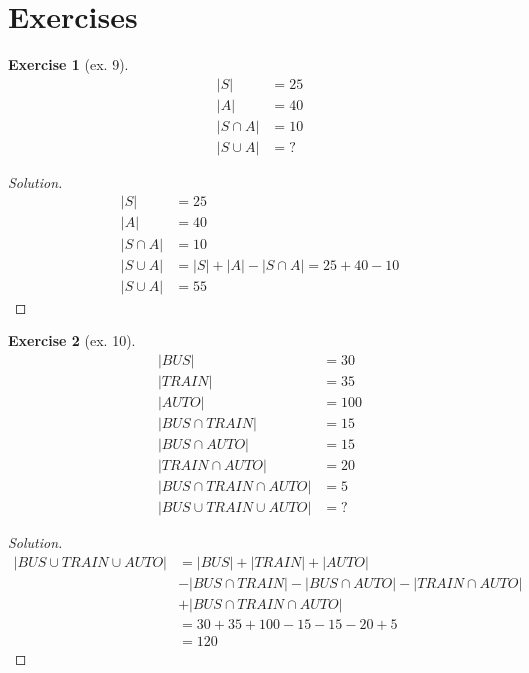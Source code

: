 \documentclass{article}
\theoremstyle{definition}
\newtheorem{exercise}{Exercise}[section]
\begin{document}
\section{Exercises}  %

\begin{exercise}[ex. 9]
    \[
    \begin{aligned}
        |S| &= 25 \\
        |A| &= 40 \\
        |S\cap A| &= 10\\
        |S\cup A| &= ?
    \end{aligned}
\]
\end{exercise}
\begin{proof}[Solution]
\[
    \begin{aligned}
        |S| &= 25 \\
        |A| &= 40 \\
        |S\cap A| &= 10\\
        |S\cup A| &= |S| + |A| - |S\cap A| = 25 + 40 - 10\\
        |S\cup A| &= 55
    \end{aligned}
\]
\end{proof}



\begin{exercise}[ex. 10]
    \[
    \begin{aligned}
        |BUS| &= 30 \\
        |TRAIN| &= 35 \\
        |AUTO| &= 100 \\
        |BUS \cap TRAIN| &= 15 \\
        |BUS \cap AUTO| &= 15 \\
        |TRAIN \cap AUTO| &= 20\\
        |BUS \cap TRAIN \cap AUTO| &= 5 \\
        |BUS \cup TRAIN \cup AUTO| &= ?
    \end{aligned}
\]
\end{exercise}
\begin{proof}[Solution]
\[
    \begin{aligned}
        |BUS \cup TRAIN \cup AUTO| &= |BUS| + |TRAIN| + |AUTO| \\
                                    &- |BUS \cap TRAIN| - |BUS \cap AUTO| - |TRAIN \cap AUTO| \\
                                    &+ |BUS \cap TRAIN \cap AUTO| \\
                                    &= 30 + 35 + 100 - 15 - 15 -20 + 5 \\
                                    &= 120
    \end{aligned}
\]
\end{proof}
\end{document}
